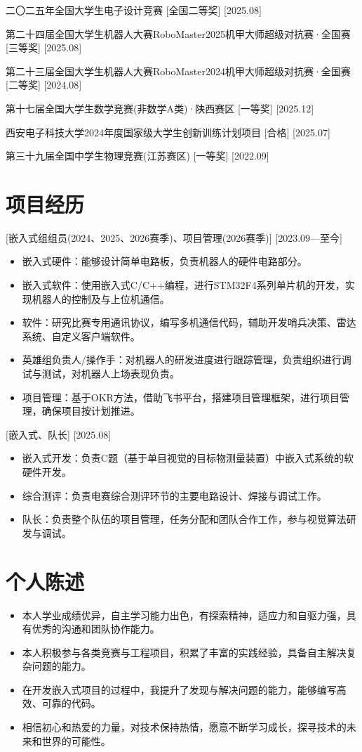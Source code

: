 \documentclass{resume}
\begin{document}
\ResumeItem
{二〇二五年全国大学生电子设计竞赛}
[全国二等奖]
[2025.08]

\ResumeItem
{第二十四届全国大学生机器人大赛RoboMaster2025机甲大师超级对抗赛·全国赛}
[三等奖]
[2025.08]

\ResumeItem
{第二十三届全国大学生机器人大赛RoboMaster2024机甲大师超级对抗赛·全国赛}
[二等奖]
[2024.08]

\ResumeItem
{第十七届全国大学生数学竞赛(非数学A类)·陕西赛区}
[一等奖]
[2025.12]

\ResumeItem
{西安电子科技大学2024年度国家级大学生创新训练计划项目}
[合格]
[2025.07]

\ResumeItem
{第三十九届全国中学生物理竞赛(江苏赛区)}
[一等奖]
[2022.09]

\section{项目经历}

[\textnormal{嵌入式组组员(2024、2025、2026赛季)、项目管理(2026赛季)}]
[2023.09—至今]
\begin{itemize}
  \item 嵌入式硬件：能够设计简单电路板，负责机器人的硬件电路部分。
  \item 嵌入式软件：使用嵌入式C/C++编程，进行STM32F4系列单片机的开发，实现机器人的控制及与上位机通信。
  \item 软件：研究比赛专用通讯协议，编写多机通信代码，辅助开发哨兵决策、雷达系统、自定义客户端软件。
  \item 英雄组负责人/操作手：对机器人的研发进度进行跟踪管理，负责组织进行调试与测试，对机器人上场表现负责。
  \item 项目管理：基于OKR方法，借助飞书平台，搭建项目管理框架，进行项目管理，确保项目按计划推进。
\end{itemize}

[嵌入式、队长]
[2025.08]
\begin{itemize}
  \item 嵌入式开发：负责C题（基于单目视觉的目标物测量装置）中嵌入式系统的软硬件开发。
  \item 综合测评：负责电赛综合测评环节的主要电路设计、焊接与调试工作。
  \item 队长：负责整个队伍的项目管理，任务分配和团队合作工作，参与视觉算法研发与调试。
\end{itemize}

\section{个人陈述}

\begin{itemize}
  \item 本人学业成绩优异，自主学习能力出色，有探索精神，适应力和自驱力强，具有优秀的沟通和团队协作能力。
  \item 本人积极参与各类竞赛与工程项目，积累了丰富的实践经验，具备自主解决复杂问题的能力。
  \item 在开发嵌入式项目的过程中，我提升了发现与解决问题的能力，能够编写高效、可靠的代码。
  \item 相信初心和热爱的力量，对技术保持热情，愿意不断学习成长，探寻技术的未来和世界的可能性。
\end{itemize}
\end{document}
